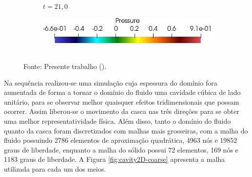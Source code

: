 \begin{figure}[h!]
\begin{subfigure}[b]{0.3\textwidth}
        \caption{$t=21,0$}
    \end{subfigure}
    \begin{subfigure}[b]{0.4\textwidth}
        \includegraphics[width=\linewidth]{Figuras/FSI-Cavity2D/legenda.png}
    \end{subfigure}
    \\Fonte: Presente trabalho (\the\year).
    \label{fig:cavity2D-time}
\end{figure}

Na sequência realizou-se uma simulação cuja espessura do domínio fora aumentada de forma a tornar o domínio do fluido uma cavidade cúbica de lado unitário, para se observar melhor quaisquer efeitos tridimensionais que possam ocorrer. Assim liberou-se o movimento da casca nas três direções para se obter uma melhor representatividade física. Além disso, tanto o domínio do fluido quanto da casca foram discretizados com malhas mais grosseiras, com a malha do fluido possuindo 2786 elementos de aproximação quadrática, 4963 nós e 19852 graus de liberdade, enquanto a malha do sólido possui 72 elementos, 169 nós e 1183 graus de liberdade. A Figura \ref{fig:cavity2D-coarse} apresenta a malha utilizada para cada um dos meios.

